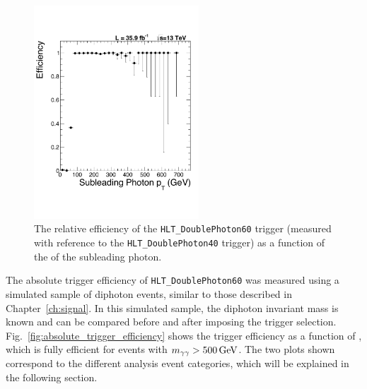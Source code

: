 \begin{figure}[!htbp]
	\centering
	\includegraphics[angle=0,width=0.55\textwidth]{figures/eff2016.pdf}
	\caption{The relative efficiency of the \texttt{HLT\_DoublePhoton60} trigger (measured with reference to the \texttt{HLT\_DoublePhoton40} trigger) as a function of the \pt of the subleading photon.}
	\label{fig:relative_trigger_efficiency}
\end{figure}

The absolute trigger efficiency of \texttt{HLT\_DoublePhoton60} was measured using a simulated sample of diphoton events, similar to those described in Chapter~\ref{ch:signal}. In this simulated sample, the diphoton invariant mass \mgg is known and can be compared before and after imposing the trigger selection. Fig.~\ref{fig:absolute_trigger_efficiency} shows the trigger efficiency as a function of \mgg, which is fully efficient for events with $m_{\gamma\gamma} > 500\,\text{Ge\hspace{-.08em}V}$. The two plots shown correspond to the different analysis event categories, which will be explained in the following section.

